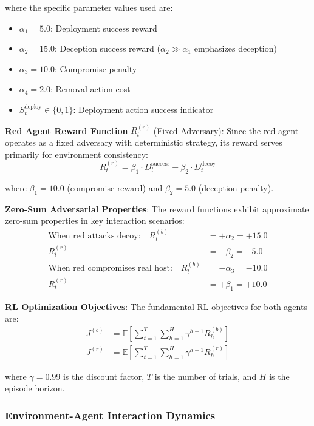 \documentclass[12pt,oneside]{article}
\begin{document}
where the specific parameter values used are:
\begin{itemize}
\item $\alpha_1 = 5.0$: Deployment success reward
\item $\alpha_2 = 15.0$: Deception success reward ($\alpha_2 \gg \alpha_1$ emphasizes deception)
\item $\alpha_3 = 10.0$: Compromise penalty  
\item $\alpha_4 = 2.0$: Removal action cost
\item $S_t^{\text{deploy}} \in \{0, 1\}$: Deployment action success indicator
\end{itemize}

\textbf{Red Agent Reward Function} $R_t^{(r)}$ (Fixed Adversary):
Since the red agent operates as a fixed adversary with deterministic strategy, its reward serves primarily for environment consistency:
\begin{equation}
R_t^{(r)} = \beta_1 \cdot D_t^{\text{success}} - \beta_2 \cdot D_t^{\text{decoy}}
\end{equation}

where $\beta_1 = 10.0$ (compromise reward) and $\beta_2 = 5.0$ (deception penalty).

\textbf{Zero-Sum Adversarial Properties}:
The reward functions exhibit approximate zero-sum properties in key interaction scenarios:
\begin{align}
\text{When red attacks decoy:} \quad R_t^{(b)} &= +\alpha_2 = +15.0 \\
R_t^{(r)} &= -\beta_2 = -5.0 \\
\text{When red compromises real host:} \quad R_t^{(b)} &= -\alpha_3 = -10.0 \\
R_t^{(r)} &= +\beta_1 = +10.0
\end{align}

\textbf{RL Optimization Objectives}:
The fundamental RL objectives for both agents are:
\begin{align}
J^{(b)} &= \mathbb{E}\left[\sum_{t=1}^{T} \sum_{h=1}^{H} \gamma^{h-1} R_h^{(b)}\right] \\
J^{(r)} &= \mathbb{E}\left[\sum_{t=1}^{T} \sum_{h=1}^{H} \gamma^{h-1} R_h^{(r)}\right]
\end{align}

where $\gamma = 0.99$ is the discount factor, $T$ is the number of trials, and $H$ is the episode horizon.

\subsubsection{Environment-Agent Interaction Dynamics}
\end{document}
